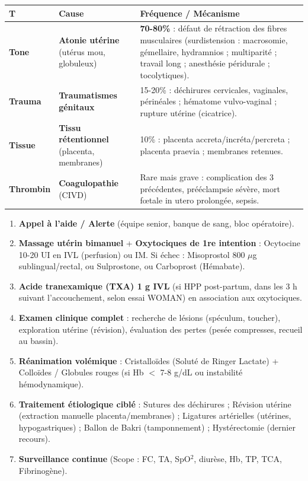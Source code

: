 \documentclass[11pt]{article}
\begin{document}
\begin{propriete}
\begin{center}
\begin{tabular}{|l|l|l|}
\hline
\textbf{T} & \textbf{Cause} & \textbf{Fréquence / Mécanisme} \\
\hline
\textbf{Tone} & \textbf{Atonie utérine} (utérus mou, globuleux) & \textbf{70-80\%} : défaut de rétraction des fibres musculaires (surdistension : macrosomie, gémellaire, hydramnios ; multiparité ; travail long ; anesthésie péridurale ; tocolytiques). \\
\hline
\textbf{Trauma} & \textbf{Traumatismes génitaux} & 15-20\% : déchirures cervicales, vaginales, périnéales ; hématome vulvo-vaginal ; rupture utérine (cicatrice). \\
\hline
\textbf{Tissue} & \textbf{Tissu rétentionnel} (placenta, membranes) & 10\% : placenta accreta/incréta/percreta ; placenta praevia ; membranes retenues. \\
\hline
\textbf{Thrombin} & \textbf{Coagulopathie} (CIVD) & Rare mais grave : complication des 3 précédentes, prééclampsie sévère, mort fœtale in utero prolongée, sepsis. \\
\hline
\end{tabular}
\end{center}
\end{propriete}

\begin{methode}
\begin{enumerate}
    \item \textbf{Appel à l'aide / Alerte} (équipe senior, banque de sang, bloc opératoire).
    \item \textbf{Massage utérin bimanuel} + \textbf{Oxytociques de 1re intention} : Ocytocine 10-20 UI en IVL (perfusion) ou IM. Si échec : Misoprostol 800 $\mu$g sublingual/rectal, ou Sulprostone, ou Carboprost (Hémabate).
    \item \textbf{Acide tranexamique (TXA) 1 g IVL} (si HPP post-partum, dans les 3 h suivant l'accouchement, selon essai WOMAN) en association aux oxytociques.
    \item \textbf{Examen clinique complet} : recherche de lésions (spéculum, toucher), exploration utérine (révision), évaluation des pertes (pesée compresses, recueil au bassin).
    \item \textbf{Réanimation volémique} : Cristalloïdes (Soluté de Ringer Lactate) + Colloïdes / Globules rouges (si Hb $<$ 7-8 g/dL ou instabilité hémodynamique).
    \item \textbf{Traitement étiologique ciblé} : Sutures des déchirures ; Révision utérine (extraction manuelle placenta/membranes) ; Ligatures artérielles (utérines, hypogastriques) ; Ballon de Bakri (tamponnement) ; Hystérectomie (dernier recours).
    \item \textbf{Surveillance continue} (Scope : FC, TA, SpO$^2$, diurèse, Hb, TP, TCA, Fibrinogène).
\end{enumerate}
\end{methode}
\end{document}
